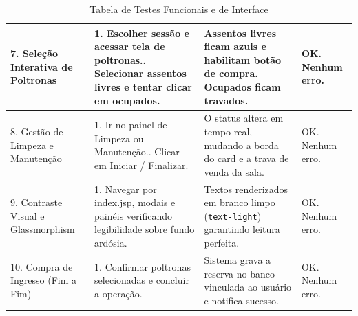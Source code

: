 \begin{table}[h]
\begin{tabular}{|p{3.5cm}|p{4.5cm}|p{4.5cm}|p{2.5cm}|}
7. Seleção Interativa de Poltronas & 1. Escolher sessão e acessar tela de poltronas.\newline 2. Selecionar assentos livres e tentar clicar em ocupados. & Assentos livres ficam azuis e habilitam botão de compra. Ocupados ficam travados. & OK. Nenhum erro. \\ \hline
8. Gestão de Limpeza e Manutenção & 1. Ir no painel de Limpeza ou Manutenção.\newline 2. Clicar em Iniciar / Finalizar. & O status altera em tempo real, mudando a borda do card e a trava de venda da sala. & OK. Nenhum erro. \\ \hline
9. Contraste Visual e Glassmorphism & 1. Navegar por index.jsp, modais e painéis verificando legibilidade sobre fundo ardósia. & Textos renderizados em branco limpo (\texttt{text-light}) garantindo leitura perfeita. & OK. Nenhum erro. \\ \hline
10. Compra de Ingresso (Fim a Fim) & 1. Confirmar poltronas selecionadas e concluir a operação. & Sistema grava a reserva no banco vinculada ao usuário e notifica sucesso. & OK. Nenhum erro. \\ \hline
\end{tabular}
\caption{Tabela de Testes Funcionais e de Interface}
\end{table}
